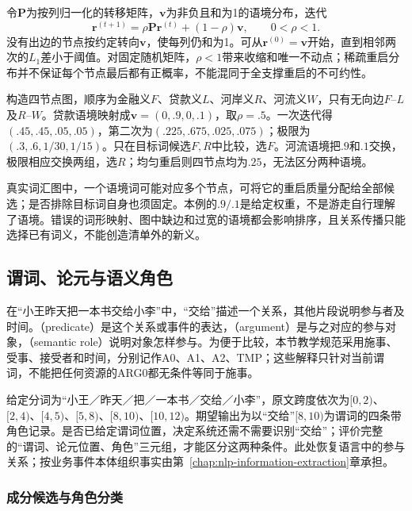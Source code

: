 令$\bm P$为按列归一化的转移矩阵，$\bm v$为非负且和为1的语境分布，迭代
\begin{equation}
 \bm r^{(t+1)}=\rho\bm P\bm r^{(t)}+(1-\rho)\bm v,
 \qquad 0<\rho<1.
 \label{eq:nlp-analysis-personalized-pagerank}
\end{equation}
没有出边的节点按约定转向$\bm v$，使每列仍和为1。可从$\bm r^{(0)}=\bm v$开始，直到相邻两次的$L_1$差小于阈值。对固定随机矩阵，$\rho<1$带来收缩和唯一不动点；稀疏重启分布并不保证每个节点最后都有正概率，不能混同于全支撑重启的不可约性。

构造四节点图，顺序为金融义$F$、贷款义$L$、河岸义$R$、河流义$W$，只有无向边$F$--$L$及$R$--$W$。贷款语境映射成$\bm v=(0,.9,0,.1)$，取$\rho=.5$。一次迭代得$(.45,.45,.05,.05)$，第二次为$(.225,.675,.025,.075)$；极限为$(.3,.6,1/30,1/15)$。只在目标词候选$F,R$中比较，选$F$。河流语境把$.9$和$.1$交换，极限相应交换两组，选$R$；均匀重启则四节点均为$.25$，无法区分两种语境。

真实词汇图中，一个语境词可能对应多个节点，可将它的重启质量分配给全部候选；是否排除目标词自身也须固定。本例的$.9/.1$是给定权重，不是游走自行理解了语境。错误的词形映射、图中缺边和过宽的语境都会影响排序，且关系传播只能选择已有词义，不能创造清单外的新义。

\subsection{谓词、论元与语义角色}
\label{sec:nlp-analysis-srl}

在“小王昨天把一本书交给小李”中，“交给”描述一个关系，其他片段说明参与者及时间。（predicate）是这个关系或事件的表达，（argument）是与之对应的参与对象，（semantic role）说明对象怎样参与。为便于比较，本节教学规范采用施事、受事、接受者和时间，分别记作A0、A1、A2、TMP；这些解释只针对当前谓词，不能把任何资源的ARG0都无条件等同于施事。

给定分词为“小王／昨天／把／一本书／交给／小李”，原文跨度依次为$[0,2)$、$[2,4)$、$[4,5)$、$[5,8)$、$[8,10)$、$[10,12)$。期望输出为以“交给”$[8,10)$为谓词的四条带角色记录。是否已给定谓词位置，决定系统还需不需要识别“交给”；评价完整的“谓词、论元位置、角色”三元组，才能区分这两种条件。此处恢复语言中的参与关系；按业务事件本体组织事实由第~\ref{chap:nlp-information-extraction}章承担。

\subsubsection{成分候选与角色分类}
\label{sec:nlp-analysis-srl-constituents}

